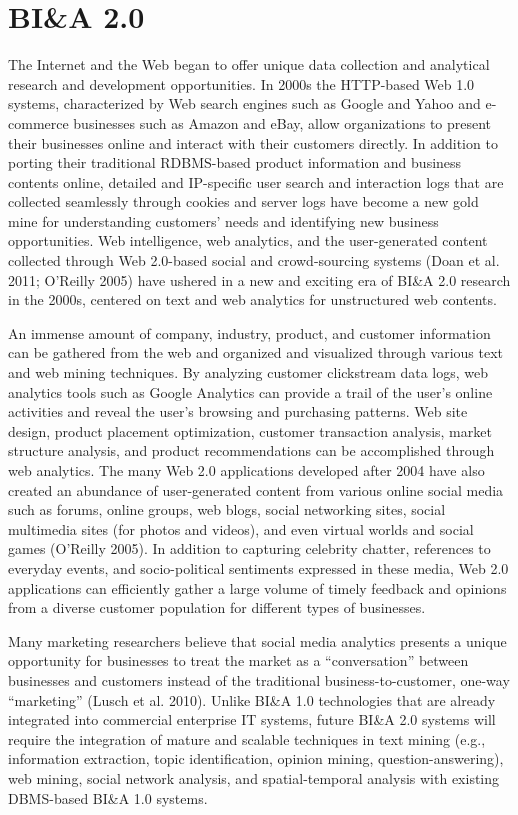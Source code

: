 \section{BI\&A 2.0}
The Internet and the Web began to offer
unique data collection and analytical research and development opportunities. In 2000s the HTTP-based Web 1.0 systems,
characterized by Web search engines such as Google and
Yahoo and e-commerce businesses such as Amazon and
eBay, allow organizations to present their businesses online
and interact with their customers directly. 
In addition to porting their traditional RDBMS-based product information
and business contents online, detailed and IP-specific user
search and interaction logs that are collected seamlessly
through cookies and server logs have become a new gold
mine for understanding customers’ needs and identifying new
business opportunities. Web intelligence, web analytics, and
the user-generated content collected through Web 2.0-based
social and crowd-sourcing systems (Doan et al. 2011;
O’Reilly 2005) have ushered in a new and exciting era of
BI\&A 2.0 research in the 2000s, centered on text and web
analytics for unstructured web contents.

An immense amount of company, industry, product, and
customer information can be gathered from the web and
organized and visualized through various text and web mining
techniques. By analyzing customer clickstream data logs,
web analytics tools such as Google Analytics can provide a
trail of the user’s online activities and reveal the user’s
browsing and purchasing patterns. Web site design, product
placement optimization, customer transaction analysis, market
structure analysis, and product recommendations can be
accomplished through web analytics. The many Web 2.0
applications developed after 2004 have also created an abundance of user-generated content from various online social
media such as forums, online groups, web blogs, social networking sites, social multimedia sites (for photos and videos),
and even virtual worlds and social games (O’Reilly 2005). In
addition to capturing celebrity chatter, references to everyday
events, and socio-political sentiments expressed in these
media, Web 2.0 applications can efficiently gather a large
volume of timely feedback and opinions from a diverse
customer population for different types of businesses.

Many marketing researchers believe that social media
analytics presents a unique opportunity for businesses to treat
the market as a “conversation” between businesses and
customers instead of the traditional business-to-customer,
one-way “marketing” (Lusch et al. 2010). Unlike BI\&A 1.0
technologies that are already integrated into commercial
enterprise IT systems, future BI\&A 2.0 systems will require
the integration of mature and scalable techniques in text
mining (e.g., information extraction, topic identification,
opinion mining, question-answering), web mining, social
network analysis, and spatial-temporal analysis with existing
DBMS-based BI\&A 1.0 systems.

